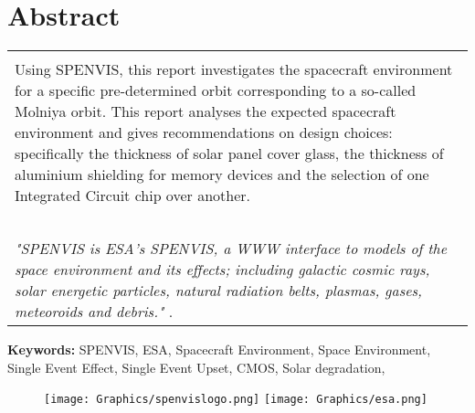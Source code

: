 \section*{Abstract}



\begin{table}[h]
    \begin{tabular}{|p{\linewidth}|}
        \hline \\
        Using \ac{SPENVIS}, this report investigates the spacecraft environment for a specific pre-determined orbit corresponding to a so-called Molniya orbit.
        This report analyses the expected spacecraft environment and gives recommendations on design choices: specifically the thickness of solar panel cover glass, the thickness of aluminium shielding for memory devices and the selection of one Integrated Circuit chip over another. 
        \\~\\
        \textit{"\acs{SPENVIS} is \ac{ESA}'s \acf{SPENVIS}, a WWW interface to models of the space environment and its effects; including galactic cosmic rays, solar energetic particles, natural radiation belts, plasmas, gases, meteoroids and debris."} \cite{spenvis_webpage}.
        \\
        \hline
    \end{tabular}
    \label{abbreviations}
\end{table}
\textbf{Keywords:} SPENVIS, ESA, Spacecraft Environment, Space Environment, Single Event Effect, Single Event Upset, CMOS, Solar degradation, 

\vspace{2cm}
        \begin{figure}[h]
            \centering
            \texttt{[image: Graphics/spenvislogo.png]}
            \hspace{1cm}\texttt{[image: Graphics/esa.png]}
        \end{figure}